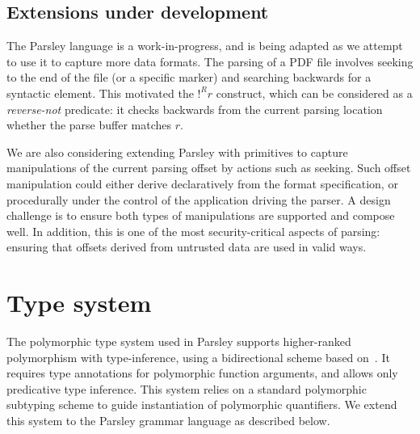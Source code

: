 \documentclass[letterpaper]{article}
\begin{document}
\subsection*{Extensions under development}

The Parsley language is a work-in-progress, and is being adapted as we
attempt to use it to capture more data formats.  The parsing of a PDF
file involves seeking to the end of the file (or a specific marker)
and searching backwards for a syntactic element.  This motivated the
$!^Rr$ construct, which can be considered as a \emph{reverse-not}
predicate: it checks backwards from the current parsing location
whether the parse buffer matches $r$.

We are also considering extending Parsley with primitives to capture
manipulations of the current parsing offset by actions such as
seeking.  Such offset manipulation could either derive declaratively
from the format specification, or procedurally under the control of
the application driving the parser.  A design challenge is to ensure
both types of manipulations are supported and compose well.  In
addition, this is one of the most security-critical aspects of
parsing: ensuring that offsets derived from untrusted data are used in
valid ways.

\section{Type system}
\label{s:typesys}

The polymorphic type system used in Parsley supports higher-ranked
polymorphism with type-inference, using a bidirectional scheme based
on~\cite{Dunfield13:bidir}.  It requires type annotations for
polymorphic function arguments, and allows only predicative type
inference.  This system relies on a standard polymorphic subtyping
scheme \cite{odersky96} to guide instantiation of polymorphic
quantifiers.  We extend this system to the Parsley grammar language as
described below.
\end{document}
